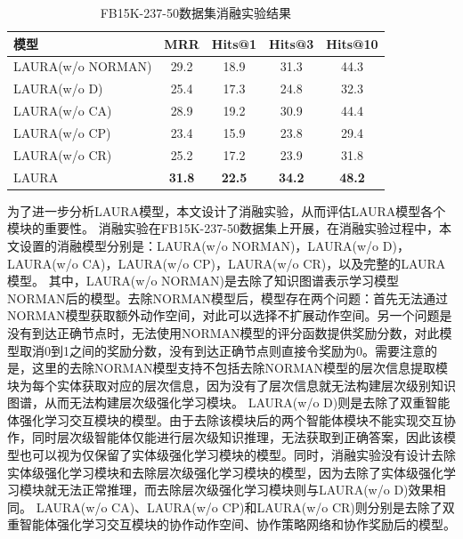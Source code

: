 \documentclass[algorithmlist, AutoFakeBold, AutoFakeSlant, figurelist, tablelist, nomlist, engineering]{seuthesix}
\begin{document}
\begin{table}[t]
  \centering
  \begin{tabular*}{0.95\textwidth}{@{\extracolsep{\fill}}lcccc}
  \toprule[1pt]
  模型 & MRR & Hits@1 & Hits@3 & Hits@10 \\ \hline
  LAURA(w/o NORMAN) & 29.2 & 18.9 & 31.3 & 44.3 \\
  LAURA(w/o D) & 25.4 & 17.3 & 24.8 & 32.3 \\
  LAURA(w/o CA) & 28.9 & 19.2 & 30.9 & 44.4 \\
  LAURA(w/o CP) & 23.4 & 15.9 & 23.8 & 29.4 \\
  LAURA(w/o CR) & 25.2 & 17.2 & 23.9 & 31.8 \\
  LAURA & \textbf{31.8} & \textbf{22.5} & \textbf{34.2} & \textbf{48.2} \\
  \bottomrule[1pt]
  \end{tabular*}
  \caption{FB15K-237-50数据集消融实验结果}
  \label{Experiment2_ablation}
\end{table}
为了进一步分析LAURA模型，本文设计了消融实验，从而评估LAURA模型各个模块的重要性。
消融实验在FB15K-237-50数据集上开展，在消融实验过程中，本文设置的消融模型分别是：LAURA(w/o NORMAN)，LAURA(w/o D)，LAURA(w/o CA)，LAURA(w/o CP)，LAURA(w/o CR)，以及完整的LAURA模型。
其中，LAURA(w/o NORMAN)是去除了知识图谱表示学习模型NORMAN后的模型。去除NORMAN模型后，模型存在两个问题：首先无法通过NORMAN模型获取额外动作空间，对此可以选择不扩展动作空间。另一个问题是没有到达正确节点时，无法使用NORMAN模型的评分函数提供奖励分数，对此模型取消0到1之间的奖励分数，没有到达正确节点则直接令奖励为0。需要注意的是，这里的去除NORMAN模型支持不包括去除NORMAN模型的层次信息提取模块为每个实体获取对应的层次信息，因为没有了层次信息就无法构建层次级别知识图谱，从而无法构建层次级强化学习模块。
LAURA(w/o D)则是去除了双重智能体强化学习交互模块的模型。由于去除该模块后的两个智能体模块不能实现交互协作，同时层次级智能体仅能进行层次级知识推理，无法获取到正确答案，因此该模型也可以视为仅保留了实体级强化学习模块的模型。同时，消融实验没有设计去除实体级强化学习模块和去除层次级强化学习模块的模型，因为去除了实体级强化学习模块就无法正常推理，而去除层次级强化学习模块则与LAURA(w/o D)效果相同。
LAURA(w/o CA)、LAURA(w/o CP)和LAURA(w/o CR)则分别是去除了双重智能体强化学习交互模块的协作动作空间、协作策略网络和协作奖励后的模型。
\end{document}
